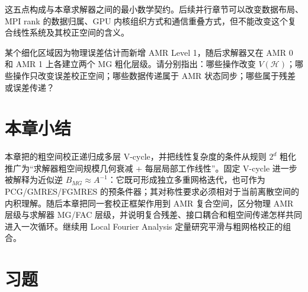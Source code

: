 这五点构成与本章求解器之间的最小数学契约。后续并行章节可以改变数据布局、MPI rank 的数据归属、GPU 内核组织方式和通信重叠方式，但不能改变这个复合线性系统及其校正空间的含义。

\begin{checkpointbox}
某个细化区域因为物理误差估计而新增 AMR Level 1，随后求解器又在 AMR 0 和 AMR 1 上各建立两个 MG 粗化层级。请分别指出：哪些操作改变 $V(\mathcal H)$；哪些操作只改变误差校正空间；哪些数据传递属于 AMR 状态同步；哪些属于残差或误差传递？
\end{checkpointbox}


\section{本章小结}

本章把的粗空间校正递归成多层 V-cycle，并把线性复杂度的条件从规则 $2^d$ 粗化推广为“求解器粗空间规模几何衰减 + 每层局部工作线性”。固定 V-cycle 进一步被解释为近似逆 $B_{MG}\approx A^{-1}$：它既可形成独立多重网格迭代，也可作为 PCG/GMRES/FGMRES 的预条件器；其对称性要求必须相对于当前离散空间的内积理解。随后本章把同一套校正框架作用到 AMR 复合空间，区分物理 AMR 层级与求解器 MG/FAC 层级，并说明复合残差、接口耦合和粗空间传递怎样共同进入一次循环。继续用 Local Fourier Analysis 定量研究平滑与粗网格校正的组合。

\section*{习题}

